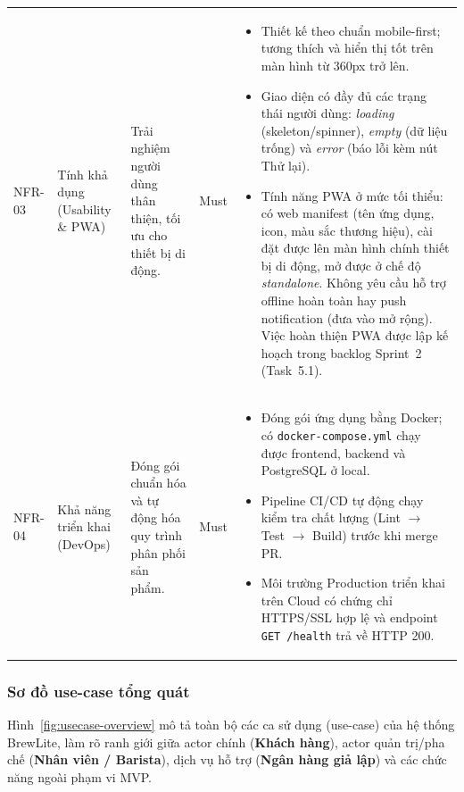 \begin{longtable}{@{}p{1.4cm}p{3.2cm}p{5.0cm}p{1.4cm}p{5.0cm}@{}}
NFR-03 & Tính khả dụng (Usability \& PWA)
  & Trải nghiệm người dùng thân thiện, tối ưu cho thiết bị di động.
  & Must
  & \begin{itemize}[leftmargin=*]
      \item Thiết kế theo chuẩn mobile-first; tương thích và hiển thị tốt trên màn hình từ 360px trở lên.
      \item Giao diện có đầy đủ các trạng thái người dùng: \emph{loading} (skeleton/spinner), \emph{empty} (dữ liệu trống) và \emph{error} (báo lỗi kèm nút Thử lại).
      \item Tính năng PWA ở mức tối thiểu: có web manifest (tên ứng dụng, icon, màu sắc thương hiệu), cài đặt được lên màn hình chính thiết bị di động, mở được ở chế độ \emph{standalone}. Không yêu cầu hỗ trợ offline hoàn toàn hay push notification (đưa vào mở rộng). Việc hoàn thiện PWA được lập kế hoạch trong backlog Sprint~2 (Task~5.1).
    \end{itemize} \\
\addlinespace

NFR-04 & Khả năng triển khai (DevOps)
  & Đóng gói chuẩn hóa và tự động hóa quy trình phân phối sản phẩm.
  & Must
  & \begin{itemize}[leftmargin=*]
      \item Đóng gói ứng dụng bằng Docker; có \texttt{docker-compose.yml} chạy được frontend, backend và PostgreSQL ở local.
      \item Pipeline CI/CD tự động chạy kiểm tra chất lượng (Lint $\rightarrow$ Test $\rightarrow$ Build) trước khi merge PR.
      \item Môi trường Production triển khai trên Cloud có chứng chỉ HTTPS/SSL hợp lệ và endpoint \texttt{GET /health} trả về HTTP 200.
    \end{itemize} \\
\bottomrule
\end{longtable}

\subsubsection{Sơ đồ use-case tổng quát}

Hình~\ref{fig:usecase-overview} mô tả toàn bộ các ca sử dụng (use-case) của hệ thống BrewLite, làm rõ ranh giới giữa actor chính (\textbf{Khách hàng}), actor quản trị/pha chế (\textbf{Nhân viên / Barista}), dịch vụ hỗ trợ (\textbf{Ngân hàng giả lập}) và các chức năng ngoài phạm vi MVP.

